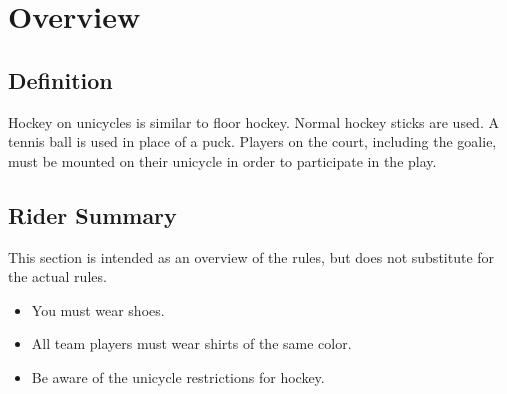 \chapter{Overview}

\section{Definition}

Hockey on unicycles is similar to floor hockey. Normal hockey
sticks are used.  A tennis ball is used in place of a puck. Players on the
court, including the goalie, must be mounted on their unicycle in order to participate in the play.

\section{Rider Summary}

This section is intended as an overview of the rules, but does not substitute for the actual rules.
\begin{itemize}
\item You must wear shoes.
\item All team players must wear shirts of the same color.
\item Be aware of the unicycle restrictions for hockey.
\end{itemize}
